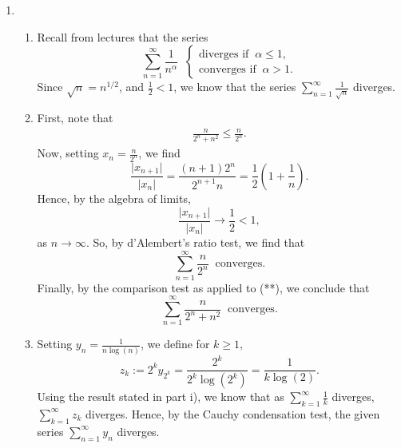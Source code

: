 \documentclass[
  10pt,
  a4paper]{article}
\providecommand{\tightlist}{%
  \setlength{\itemsep}{0pt}\setlength{\parskip}{0pt}}
\theoremstyle{plain}
\theoremstyle{definition}
\theoremstyle{plain}
\theoremstyle{plain}
\theoremstyle{plain}
\theoremstyle{plain}
\theoremstyle{definition}
\theoremstyle{definition}
\theoremstyle{remark}
\theoremstyle{remark}
\begin{document}
\begin{enumerate}
\begin{enumerate}
  \end{enumerate}
\item
  \begin{enumerate}
  \def\labelenumii{\roman{enumii})}
  \tightlist
  \item
    Recall from lectures that the series \[\sum_{n=1}^{\infty} \frac{1}{n^{\alpha}}\;\;\begin{cases}\text{diverges if}\;\; \alpha \leq 1,\\
    \text{converges if}\;\; \alpha > 1.
    \end{cases}\] Since \(\sqrt{n} = n^{1/2}\), and \(\frac{1}{2}<1\), we know that the series \(\sum_{n=1}^{\infty}\frac{1}{\sqrt{n}}\) diverges.
  \item
    First, note that
    \begin{align}
    \frac{n}{2^n + n^2} \leq \frac{n}{2^n}.\tag{**}
    \end{align}
    Now, setting \(x_n = \frac{n}{2^n}\), we find \[\frac{\lvert x_{n+1}\rvert}{\lvert x_n \rvert} = \frac{(n+1)2^n}{2^{n+1}n} = \frac{1}{2}\left(1 + \frac{1}{n}\right).\] Hence, by the algebra of limits, \[\frac{\lvert x_{n+1}\rvert}{\lvert x_n \rvert} \to \frac{1}{2} < 1,\] as \(n \to \infty\). So, by d'Alembert's ratio test, we find that \[\sum_{n=1}^{\infty}\frac{n}{2^n} \; \; \text{converges.}\] Finally, by the comparison test as applied to (**), we conclude that \[\sum_{n=1}^{\infty}\frac{n}{2^n + n^2} \; \; \text{converges.}\]
  \item
    Setting \(y_n = \frac{1}{n\log(n)}\), we define for \(k \geq 1,\) \[z_{k}:= 2^k y_{2^k} = \frac{2^k}{2^k\log(2^k)} = \frac{1}{k\log(2)}.\] Using the result stated in part i), we know that as \(\sum_{k=1}^{\infty}\frac{1}{k}\) diverges, \(\sum_{k=1}^{\infty} z_k\) diverges. Hence, by the Cauchy condensation test, the given series \(\sum_{n=1}^{\infty}y_n\) diverges.
  \end{enumerate}
\end{enumerate}
\end{document}
